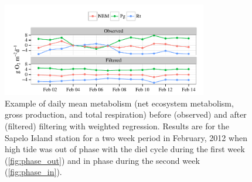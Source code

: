 \documentclass[letterpaper,12pt,oneside]{article}\usepackage[]{graphicx}\usepackage[]{color}
\newenvironment{knitrout}{}{} %
\begin{document}
\centering\vspace*{\fill}
\begin{knitrout}
\color{fgcolor}\begin{figure}[!ht]


{\centering \includegraphics[width=0.8\textwidth]{figure/case_ex} 

}

\caption[Example of daily mean metabolism (net ecosystem metabolism, gross production, and total respiration) before (observed) and after (filtered) filtering with weighted regression]{Example of daily mean metabolism (net ecosystem metabolism, gross production, and total respiration) before (observed) and after (filtered) filtering with weighted regression. Results are for the Sapelo Island station for a two week period in February, 2012 when high tide was out of phase with the diel cycle during the first week (\cref{fig:phase_out}) and in phase during the second week (\cref{fig:phase_in}).\label{fig:case_ex}}
\end{figure}


\end{knitrout}
\end{document}
